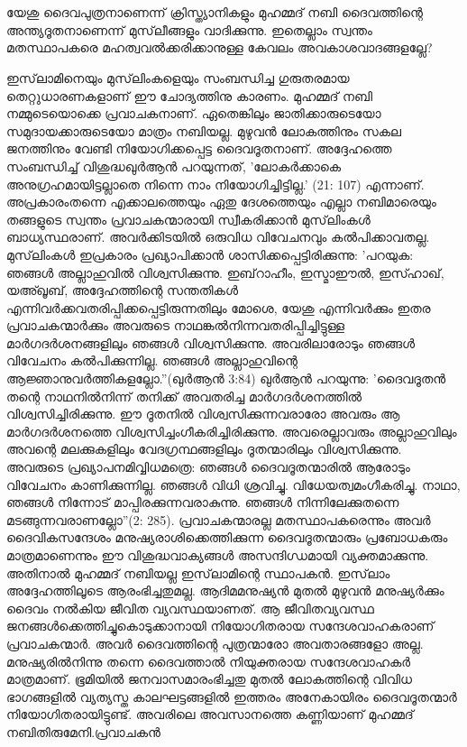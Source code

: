 \section{}  യേശു ദൈവപുത്രനാണെന്ന് ക്രിസ്ത്യാനികളും മുഹമ്മദ് നബി ദൈവത്തിന്റെ അന്ത്യദൂതനാണെന്ന് മുസ്‌ലീങ്ങളും വാദിക്കുന്നു. ഇതെല്ലാം സ്വന്തം മതസ്ഥാപകരെ മഹത്വവല്‍ക്കരിക്കാനുള്ള കേവലം അവകാശവാദങ്ങളല്ലേ?

   
 ഇസ്‌ലാമിനെയും മുസ്‌ലിംകളെയും സംബന്ധിച്ച ഗുരുതരമായ തെറ്റുധാരണകളാണ് ഈ ചോദ്യത്തിനു കാരണം. മുഹമ്മദ് നബി നമ്മുടെയൊക്കെ പ്രവാചകനാണ്. ഏതെങ്കിലും ജാതിക്കാരുടെയോ സമുദായക്കാരുടെയോ മാത്രം നബിയല്ല. മുഴുവന്‍ ലോകത്തിനും സകല ജനത്തിനും വേണ്ടി നിയോഗിക്കപ്പെട്ട ദൈവദൂതനാണ്. അദ്ദേഹത്തെ സംബന്ധിച്ച് വിശുദ്ധഖുര്‍ആന്‍ പറയുന്നത്, 'ലോകര്‍ക്കാകെ അനുഗ്രഹമായിട്ടല്ലാതെ നിന്നെ നാം നിയോഗിച്ചിട്ടില്ല.' (21: 107) എന്നാണ്.
അപ്രകാരംതന്നെ എക്കാലത്തെയും ഏതു ദേശത്തെയും എല്ലാ നബിമാരെയും തങ്ങളുടെ സ്വന്തം പ്രവാചകന്മാരായി സ്വീകരിക്കാന്‍ മുസ്‌ലിംകള്‍ ബാധ്യസ്ഥരാണ്. അവര്‍ക്കിടയില്‍ ഒരുവിധ വിവേചനവും കല്‍പിക്കാവതല്ല. മുസ്‌ലിംകള്‍ ഇപ്രകാരം പ്രഖ്യാപിക്കാന്‍ ശാസിക്കപ്പെട്ടിരിക്കുന്നു: 'പറയുക: ഞങ്ങള്‍ അല്ലാഹുവില്‍ വിശ്വസിക്കുന്നു. ഇബ്‌റാഹീം, ഇസ്മാഈല്‍, ഇസ്ഹാഖ്, യഅ്ഖൂബ്, അദ്ദേഹത്തിന്റെ സന്തതികള്‍ എന്നിവര്‍ക്കവതരിപ്പിക്കപ്പെട്ടിരുന്നതിലും മോശെ, യേശു എന്നിവര്‍ക്കും ഇതര പ്രവാചകന്മാര്‍ക്കും അവരുടെ നാഥങ്കല്‍നിന്നവതരിപ്പിച്ചിട്ടുള്ള മാര്‍ഗദര്‍ശനങ്ങളിലും ഞങ്ങള്‍ വിശ്വസിക്കുന്നു. അവരിലാരോടും ഞങ്ങള്‍ വിവേചനം കല്‍പിക്കുന്നില്ല. ഞങ്ങള്‍ അല്ലാഹുവിന്റെ ആജ്ഞാനുവര്‍ത്തികളല്ലോ.''(ഖുര്‍ആന്‍ 3:84)
ഖുര്‍ആന്‍ പറയുന്നു: 'ദൈവദൂതന്‍ തന്റെ നാഥനില്‍നിന്ന് തനിക്ക് അവതരിച്ച മാര്‍ഗദര്‍ശനത്തില്‍ വിശ്വസിച്ചിരിക്കുന്നു. ഈ ദൂതനില്‍ വിശ്വസിക്കുന്നവരാരോ അവരും ആ മാര്‍ഗദര്‍ശനത്തെ വിശ്വസിച്ചംഗീകരിച്ചിരിക്കുന്നു. അവരെല്ലാവരും അല്ലാഹുവിലും അവന്റെ മലക്കുകളിലും വേദഗ്രന്ഥങ്ങളിലും ദൂതന്മാരിലും വിശ്വസിക്കുന്നു. അവരുടെ പ്രഖ്യാപനമിവ്വിധമത്രെ: ഞങ്ങള്‍ ദൈവദൂതന്മാരില്‍ ആരോടും വിവേചനം കാണിക്കുന്നില്ല. ഞങ്ങള്‍ വിധി ശ്രവിച്ചു. വിധേയത്വമംഗീകരിച്ചു. നാഥാ, ഞങ്ങള്‍ നിന്നോട് മാപ്പിരക്കുന്നവരാകുന്നു. ഞങ്ങള്‍ നിന്നിലേക്കുതന്നെ മടങ്ങുന്നവരാണല്ലോ''(2: 285).
പ്രവാചകന്മാരല്ല മതസ്ഥാപകരെന്നും അവര്‍ ദൈവികസന്ദേശം മനുഷ്യരാശിക്കെത്തിക്കുന്ന ദൈവദൂതന്മാരും പ്രബോധകരും മാത്രമാണെന്നും ഈ വിശുദ്ധവാക്യങ്ങള്‍ അസന്ദിഗ്ധമായി വ്യക്തമാക്കുന്നു. അതിനാല്‍ മുഹമ്മദ് നബിയല്ല ഇസ്‌ലാമിന്റെ സ്ഥാപകന്‍. ഇസ്‌ലാം അദ്ദേഹത്തിലൂടെ ആരംഭിച്ചതുമല്ല. ആദിമമനുഷ്യന്‍ മുതല്‍ മുഴുവന്‍ മനുഷ്യര്‍ക്കും ദൈവം നല്‍കിയ ജീവിത വ്യവസ്ഥയാണത്. ആ ജീവിതവ്യവസ്ഥ ജനങ്ങള്‍ക്കെത്തിച്ചുകൊടുക്കാനായി നിയോഗിതരായ സന്ദേശവാഹകരാണ് പ്രവാചകന്മാര്‍. അവര്‍ ദൈവത്തിന്റെ പുത്രന്മാരോ അവതാരങ്ങളോ അല്ല. മനുഷ്യരില്‍നിന്നു തന്നെ ദൈവത്താല്‍ നിയുക്തരായ സന്ദേശവാഹകര്‍ മാത്രമാണ്. ഭൂമിയില്‍ ജനവാസമാരംഭിച്ചതു മുതല്‍ ലോകത്തിന്റെ വിവിധ ഭാഗങ്ങളില്‍ വ്യത്യസ്ത കാലഘട്ടങ്ങളില്‍ ഇത്തരം അനേകായിരം ദൈവദൂതന്മാര്‍ നിയോഗിതരായിട്ടുണ്ട്. അവരിലെ അവസാനത്തെ കണ്ണിയാണ് മുഹമ്മദ് നബിതിരുമേനി.പ്രവാചകന്‍
